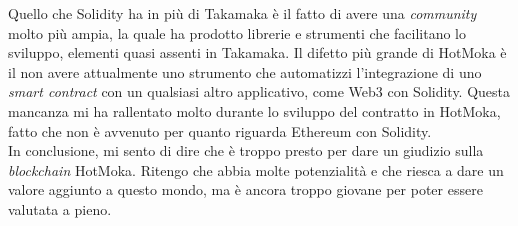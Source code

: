 Quello che Solidity ha in più di Takamaka è il fatto di avere una \textit{community} molto più ampia, la quale ha prodotto librerie e strumenti che facilitano lo sviluppo, elementi quasi assenti in Takamaka. Il difetto più grande di HotMoka è il non avere attualmente uno strumento che automatizzi l'integrazione di uno \textit{smart contract} con un qualsiasi altro applicativo, come Web3 con Solidity. Questa mancanza mi ha rallentato molto durante lo sviluppo del contratto in HotMoka, fatto che non è avvenuto per quanto riguarda Ethereum con Solidity. \\

In conclusione, mi sento di dire che è troppo presto per dare un giudizio sulla \textit{blockchain} HotMoka. Ritengo che abbia molte potenzialità e che riesca a dare un valore aggiunto a questo mondo, ma è ancora troppo giovane per poter essere valutata a pieno. 
